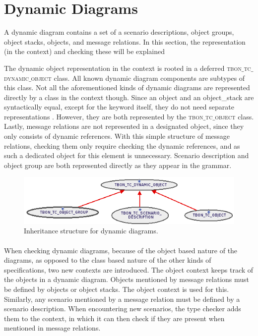 \section{Dynamic Diagrams}
A dynamic diagram contains a set of a scenario descriptions, object groups, object stacks, objects, and message relations. In this section, the representation (in the context) and checking these will be explained

The dynamic object representation in the context is rooted in a deferred \textsc{tbon$\_$tc$\_$dynamic$\_$object} class. All known dynamic diagram components are subtypes of this class. Not all the aforementioned kinds of dynamic diagrams are represented directly by a class in the context though. Since an object and an object\_stack are syntactically equal, except for the keyword itself, they do not need separate representations \cite[p. 358]{walden1995}. However, they are both represented by the \textsc{tbon$\_$tc$\_$object} class. Lastly, message relations are not represented in a designated object, since they only consists of dynamic references. With this simple structure of message relations, checking them only require checking the dynamic references, and as such a dedicated object for this element is unnecessary. Scenario description and object group are both represented directly as they appear in the grammar.

\begin{figure}[h]
\centerline{
\includegraphics[scale=0.7]{images/dynamic-diagram.png}
}
\caption{Inheritance structure for dynamic diagrams.}
\label{fig:dynamic-diagram}
\end{figure}

\paragraph{}
When checking dynamic diagrams, because of the object based nature of the diagrams, as opposed to the class based nature of the other kinds of specifications, two new contexts are introduced. The object context keeps track of the objects in a dynamic diagram. Objects mentioned by message relations must be defined by objects or object stacks. The object context is used for this. Similarly, any scenario mentioned by a message relation must be defined by a scenario description. When encountering new scenarios, the type checker adds them to the context, in which it can then check if they are present when mentioned in message relations.

